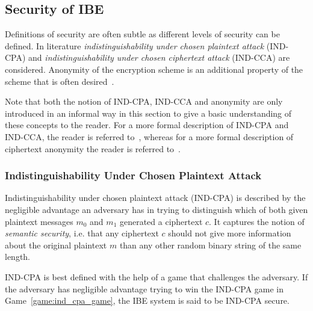 \subsection{Security of IBE}
Definitions of security are often subtle as different levels of security can be defined. In literature \textit{indistinguishability under chosen plaintext attack} (IND-CPA) and \textit{indistinguishability under chosen ciphertext attack} (IND-CCA) are considered. Anonymity of the encryption scheme is an additional property of the scheme that is often desired~\cite{art:BellareBDP01}.

Note that both the notion of IND-CPA, IND-CCA and anonymity are only introduced in an informal way in this section to give a basic understanding of these concepts to the reader. For a more formal description of IND-CPA and IND-CCA, the reader is referred to~\cite{art:BonehF01}, whereas for a more formal description of ciphertext anonymity the reader is referred to~\cite{art:AbdallaBCKKLMNPS05}.

\subsubsection{Indistinguishability Under Chosen Plaintext Attack}
Indistinguishability under chosen plaintext attack (IND-CPA) is described by the negligible advantage an adversary has in trying to distinguish which of both given plaintext messages $m_0$ and $m_1$ generated a ciphertext $c$. It captures the notion of \textit{semantic security}, i.e. that any ciphertext $c$ should not give more information about the original plaintext $m$ than any other random binary string of the same length.

IND-CPA is best defined with the help of a game that challenges the adversary. If the adversary has negligible advantage trying to win the IND-CPA game in Game~\ref{game:ind_cpa_game}, the IBE system is said to be IND-CPA secure.

